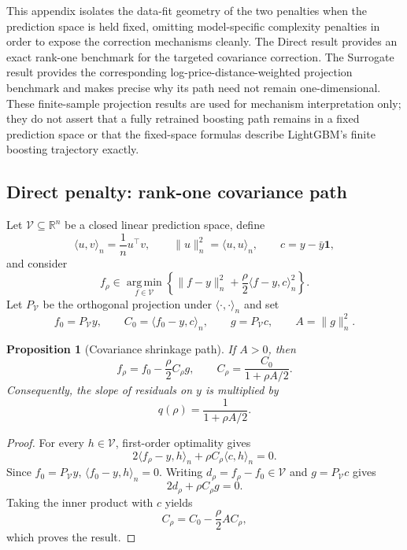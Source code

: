 \documentclass[10pt]{article}
\newtheorem{proposition}{Proposition}
\theoremstyle{definition}
\newcommand{\R}{\mathbb{R}}
\newcommand{\1}{\mathbf{1}}
\newcommand{\Vcal}{\mathcal{V}}
\newcommand{\argminop}{\operatorname*{arg\,min}}
\begin{document}
This appendix isolates the data-fit geometry of the two penalties when the prediction space is held fixed, omitting model-specific complexity penalties in order to expose the correction mechanisms cleanly. The Direct result provides an exact rank-one benchmark for the targeted covariance correction. The Surrogate result provides the corresponding log-price-distance-weighted projection benchmark and makes precise why its path need not remain one-dimensional. These finite-sample projection results are used for mechanism interpretation only; they do not assert that a fully retrained boosting path remains in a fixed prediction space or that the fixed-space formulas describe LightGBM's finite boosting trajectory exactly.

\subsection{Direct penalty: rank-one covariance path}

Let $\Vcal\subseteq\R^n$ be a closed linear prediction space, define
\[
\langle u,v\rangle_n=\frac{1}{n}u^\top v,
\qquad
\|u\|_n^2=\langle u,u\rangle_n,
\qquad
c=y-\bar y\1,
\]
and consider
\begin{equation}
\label{eq:path_problem}
f_\rho\in\argminop_{f\in\Vcal}
\left\{
\|f-y\|_n^2
+\frac{\rho}{2}\langle f-y,c\rangle_n^2
\right\}.
\end{equation}
Let $P_{\Vcal}$ be the orthogonal projection under $\langle\cdot,\cdot\rangle_n$ and set
\[
f_0=P_{\Vcal}y,\qquad
C_0=\langle f_0-y,c\rangle_n,\qquad
g=P_{\Vcal}c,\qquad
A=\|g\|_n^2.
\]

\begin{proposition}[Covariance shrinkage path]
\label{prop:path}
If $A>0$, then
\[
f_\rho=f_0-\frac{\rho}{2}C_\rho g,
\qquad
C_\rho=\frac{C_0}{1+\rho A/2}.
\]
Consequently, the slope of residuals on $y$ is multiplied by
\[
q(\rho)=\frac{1}{1+\rho A/2}.
\]
\end{proposition}

\begin{proof}
For every $h\in\Vcal$, first-order optimality gives
\[
2\langle f_\rho-y,h\rangle_n
+\rho C_\rho\langle c,h\rangle_n=0.
\]
Since $f_0=P_{\Vcal}y$, $\langle f_0-y,h\rangle_n=0$. Writing
$d_\rho=f_\rho-f_0\in\Vcal$ and $g=P_{\Vcal}c$ gives
\[
2d_\rho+\rho C_\rho g=0.
\]
Taking the inner product with $c$ yields
\[
C_\rho=C_0-\frac{\rho}{2}AC_\rho,
\]
which proves the result.
\end{proof}
\end{document}

